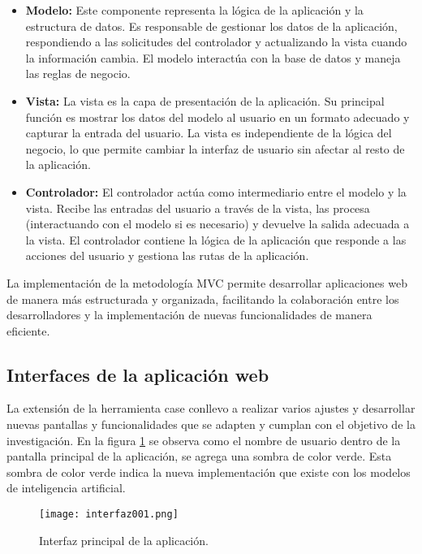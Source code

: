 \begin{itemize}
	\item \textbf{Modelo: } Este componente representa la lógica de la aplicación y la estructura de datos. Es responsable de gestionar los datos de la aplicación, respondiendo a las solicitudes del controlador y actualizando la vista cuando la información cambia. El modelo interactúa con la base de datos y maneja las reglas de negocio.
	\item \textbf{Vista: } La vista es la capa de presentación de la aplicación. Su principal función es mostrar los datos del modelo al usuario en un formato adecuado y capturar la entrada del usuario. La vista es independiente de la lógica del negocio, lo que permite cambiar la interfaz de usuario sin afectar al resto de la aplicación.
	\item \textbf{Controlador: } El controlador actúa como intermediario entre el modelo y la vista. Recibe las entradas del usuario a través de la vista, las procesa (interactuando con el modelo si es necesario) y devuelve la salida adecuada a la vista. El controlador contiene la lógica de la aplicación que responde a las acciones del usuario y gestiona las rutas de la aplicación.
\end{itemize}

La implementación de la metodología MVC permite desarrollar aplicaciones web de manera más estructurada y organizada, facilitando la colaboración entre los desarrolladores y la implementación de nuevas funcionalidades de manera eficiente.

\subsection{Interfaces de la aplicación web}

La extensión de la herramienta case conllevo a realizar varios ajustes y desarrollar nuevas pantallas y funcionalidades que se adapten y cumplan con el objetivo de la investigación. En la figura \ref{fig:cap3_interfaz_001} se observa como el nombre de usuario dentro de la pantalla principal de la aplicación, se agrega una sombra de color verde. Esta sombra de color verde indica la nueva implementación que existe con los modelos de inteligencia artificial.

\begin{figure}[H]  
	\centering
	\texttt{[image: interfaz001.png]}
	\caption{Interfaz principal de la aplicación.}
	\label{fig:cap3_interfaz_001}
\end{figure}

